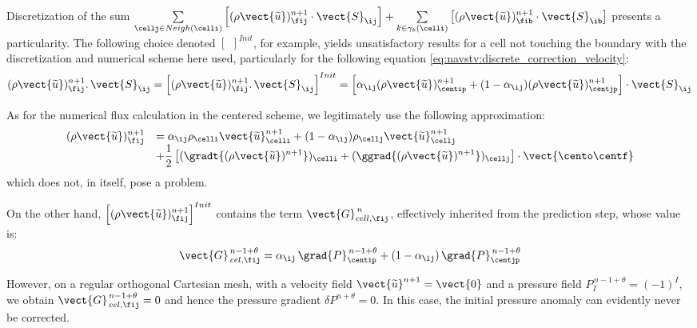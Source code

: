 Discretization of the sum $\sum\limits_{\cellj \in Neigh{(\celli)}}{\left[ (\rho
\vect{\widetilde{u}})^{n+1}_{\fij} \cdot \vect{S}_{\ij}\right]} +
\sum\limits_{k\in {\gamma_b(\celli)}} \left[{(\rho \vect{\widetilde{u}})^{n+1}_{\fib}} \cdot \vect{S}_{\ib}\right]$ presents a particularity. The following choice denoted $\left[{\ \ }\right]^{Init}$,
for example, yields unsatisfactory results for a cell not touching the boundary with the discretization and
numerical scheme here used, particularly for the following equation
\eqref{eq:navstv:discrete_correction_velocity}:
\begin{equation}
(\rho \vect{\widetilde{u}})^{n+1}_{\fij}.\,\vect{S}_{\ij}=
\left[(\rho \vect{\widetilde{u}})^{n+1}_{\fij}.\,\vect{S}_{\ij}\right]^{Init}=
\left[\alpha_{\ij} (\rho\vect{\widetilde{u}})^{n+1}_{\centip} +
(1-\alpha_{\ij}) (\rho\vect{\widetilde{u}})^{n+1}_{\centjp}\right] \cdot \vect{S}_{\ij}
\end{equation}

As for the numerical flux calculation in the centered scheme, we legitimately
use the following approximation:
\begin{equation}
\begin{array}{ll}
(\rho \vect{\widetilde{u}})^{n+1}_{\fij}&=
\alpha_{\ij} \rho_{\celli} \vect{\widetilde{u}}^{n+1}_{\celli} +
(1-\alpha_{\ij}) \rho_{\cellj} \vect{\widetilde{u}}^{n+1}_{\cellj}\\
&+\displaystyle \frac{1}{2}\left[(\gradt{(\rho\vect{\widetilde{u}})^{n+1}})_\celli
+ (\ggrad{(\rho\vect{\widetilde{u}})^{n+1}})_\cellj \right]\cdot \vect{\cento \centf}
\end{array}
\end{equation}
which does not, in itself, pose a problem.

On the other hand, $ \left[(\rho\vect{\widetilde{u}})^{n+1}_{\fij}\right]^{Init}$
contains the term $\vect{G}^{\,n}_{cell ,\fij}$, effectively inherited from the prediction step, whose value is:\\
\begin{equation*}
\vect{G}^{\,n-1+\theta}_{\,cel,\fij}=\alpha_{\ij}\, \grad{P}^{\,n-1+\theta}_{\centip} +
(1-\alpha_{\ij})\, \grad{P}^{\,n-1+\theta}_{\centjp}
\end{equation*}

However, on a regular orthogonal Cartesian mesh, with a velocity field
$\vect{\widetilde{u}}^{n+1}=\vect{0}$ and a pressure field $P^{\,n-1+\theta}_I=(-1)^{I}$,
we obtain $\vect{G}^{\,n-1+\theta}_{\,cel, \fij}=0$ and hence the pressure gradient
$\delta P^{n+\theta}=0$. In this case, the initial pressure anomaly can evidently
never be corrected.

